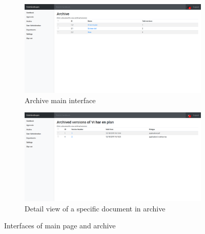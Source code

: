 \begin{figure}[H]\ContinuedFloat
	\centering
	\begin{subfigure}[b]{0.48\textwidth}
		\includegraphics[width=\textwidth]{billeder/iteration2Prototyper/Archive.png}
		\caption{Archive main interface}
		\label{fig:4-Archive}
	\end{subfigure}
	\quad
	\begin{subfigure}[b]{0.48\textwidth}
		\includegraphics[width=\textwidth]{billeder/iteration2Prototyper/Archive2.png}
		\caption{Detail view of a specific document in archive}
		\label{fig:4-DetailArchive}
	\end{subfigure}
	\caption{Interfaces of main page and archive}\label{fig:4-MainArchive}
\end{figure}

